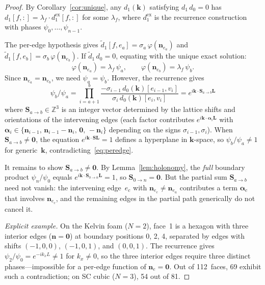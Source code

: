 \documentclass[preprint,12pt]{elsarticle}
\begin{document}
\begin{proof}
By Corollary~\ref{cor:unique}, any $d_1(\mathbf{k})$ satisfying $d_1\,d_0 = 0$ has $d_1[f,:] = \lambda_f\cdot d_1^{\mathrm{ex}}[f,:]$ for some $\lambda_f$, where $d_1^{\mathrm{ex}}$ is the recurrence construction with phases $\psi_0, \ldots, \psi_{n-1}$.

The per-edge hypothesis gives $\tilde{d}_1[f, e_a] = \sigma_a\,\varphi(\mathbf{n}_{e_a})$ and $\tilde{d}_1[f, e_b] = \sigma_b\,\varphi(\mathbf{n}_{e_b})$. If $\tilde{d}_1\,d_0 = 0$, equating with the unique exact solution:
\begin{equation}\label{eq:peredge}
  \varphi(\mathbf{n}_{e_a}) = \lambda_f\,\psi_a, \qquad \varphi(\mathbf{n}_{e_b}) = \lambda_f\,\psi_b.
\end{equation}
Since $\mathbf{n}_{e_a} = \mathbf{n}_{e_b}$, we need $\psi_a = \psi_b$. However, the recurrence gives
\begin{equation}\label{eq:phaseproduct}
  \psi_b / \psi_a = \prod_{i=a+1}^{b} \frac{-\sigma_{i-1}\,d_0(\mathbf{k})[e_{i-1}, v_i]}{\sigma_i\,d_0(\mathbf{k})[e_i, v_i]}
  = e^{i\mathbf{k}\cdot\mathbf{S}_{a\to b}\mathbf{L}}
\end{equation}
where $\mathbf{S}_{a\to b} \in \mathbb{Z}^3$ is an integer vector determined by the lattice shifts and orientations of the intervening edges (each factor contributes $e^{i\mathbf{k}\cdot\boldsymbol{\alpha}_i\mathbf{L}}$ with $\boldsymbol{\alpha}_i \in \{\mathbf{n}_{i-1},\, \mathbf{n}_{i-1}{-}\mathbf{n}_i,\, \mathbf{0},\, {-}\mathbf{n}_i\}$ depending on the signs $\sigma_{i-1}, \sigma_i$). When $\mathbf{S}_{a\to b} \neq \mathbf{0}$, the equation $e^{i\mathbf{k}\cdot\mathbf{S}\mathbf{L}} = 1$ defines a hyperplane in $\mathbf{k}$-space, so $\psi_b/\psi_a \neq 1$ for generic~$\mathbf{k}$, contradicting~\eqref{eq:peredge}.

It remains to show $\mathbf{S}_{a\to b} \neq \mathbf{0}$. By Lemma~\ref{lem:holonomy}, the \emph{full} boundary product $\psi_n/\psi_0$ equals $e^{i\mathbf{k}\cdot\mathbf{S}_{0\to n}\mathbf{L}} = 1$, so $\mathbf{S}_{0\to n} = \mathbf{0}$. But the partial sum $\mathbf{S}_{a\to b}$ need not vanish: the intervening edge~$e_c$ with $\mathbf{n}_{e_c} \neq \mathbf{n}_{e_a}$ contributes a term $\boldsymbol{\alpha}_c$ that involves $\mathbf{n}_{e_c}$, and the remaining edges in the partial path generically do not cancel it.

\emph{Explicit example.} On the Kelvin foam ($N{=}2$), face~1 is a hexagon with three interior edges ($\mathbf{n} = \mathbf{0}$) at boundary positions 0, 2, 4, separated by edges with shifts $(-1,0,0)$, $(-1,0,1)$, and $(0,0,1)$. The recurrence gives $\psi_2/\psi_0 = e^{-ik_x L} \neq 1$ for $k_x \neq 0$, so the three interior edges require three distinct phases---impossible for a per-edge function of $\mathbf{n}_e = \mathbf{0}$. Out of 112~faces, 69 exhibit such a contradiction; on SC cubic ($N{=}3$), 54 out of 81.
\end{proof}
\end{document}
